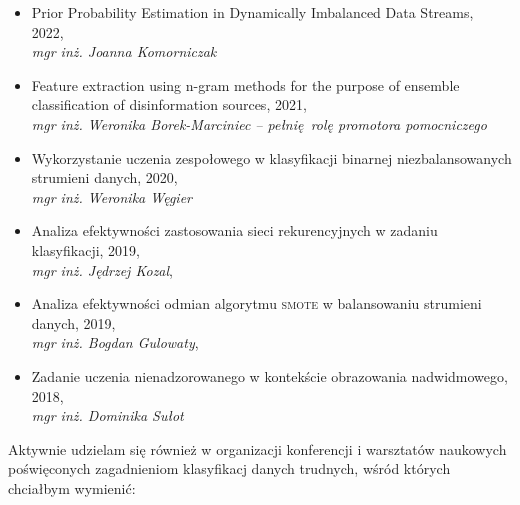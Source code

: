 \begin{itemize}
	\item Prior Probability Estimation in Dynamically Imbalanced Data Streams, 2022,~\\\emph{mgr inż. Joanna Komorniczak}\vspace{7em}
	\item Feature extraction using n-gram methods for the purpose of ensemble classification of disinformation sources, 2021,~\\\emph{mgr inż. Weronika Borek-Marciniec -- pełnię rolę promotora pomocniczego}\vspace{2em}
	\item Wykorzystanie uczenia zespołowego w klasyfikacji binarnej niezbalansowanych strumieni danych, 2020,~\\\emph{mgr inż. Weronika Węgier}\vspace{3em}
	\item Analiza efektywności zastosowania sieci rekurencyjnych w zadaniu klasyfikacji, 2019,~\\\emph{mgr inż. Jędrzej Kozal},\vspace{3em}
	\item Analiza efektywności odmian algorytmu \textsc{smote} w balansowaniu strumieni danych, 2019,~\\\emph{mgr inż. Bogdan Gulowaty},\vspace{3em}
	\item Zadanie uczenia nienadzorowanego w kontekście obrazowania nadwidmowego, 2018,~\\\emph{mgr inż. Dominika Sułot}\vspace{3.5em}
\end{itemize}

Aktywnie udzielam się również w organizacji konferencji i warsztatów naukowych poświęconych zagadnieniom klasyfikacj danych trudnych, wśród których chciałbym wymienić:

